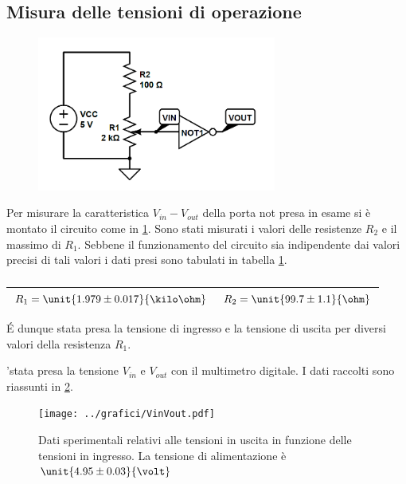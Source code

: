\documentclass[a4paper,10pt]{article}
\begin{document}
\subsection{Misura delle tensioni di operazione}

\begin{figure}[H]
	\centering
	\includegraphics[width=0.7\textwidth]{../grafici/NOTin.png}
	\caption{}
	\label{fig:NOTin}
\end{figure}
Per misurare la caratteristica $V_{in}-V_{out}$ della porta not presa in esame si è montato il circuito come in \ref{fig:NOTin}. Sono stati misurati i valori delle resistenze $R_2$ e il massimo di $R_1$. Sebbene il funzionamento del circuito sia indipendente dai valori precisi di tali valori i dati presi sono tabulati in tabella \ref{Res1}.

\begin{table}[H]
	\centering
	\begin{tabular}{c|c}
		\hline
		$R_1 = \unit{1.979 \pm 0.017}{\kilo\ohm}$ & $R_2 = \unit{99.7 \pm 1.1}{\ohm}$\\
		\hline
	\end{tabular}
	\caption{}
	\label{Res1}
\end{table}

\'E dunque stata presa la tensione di ingresso e la tensione di uscita per diversi valori della resistenza $R_1$.

'\E stata presa la tensione $V_{in}$ e $V_{out}$ con il multimetro digitale. I dati raccolti sono riassunti in \ref{fig:VinVout}.


\begin{figure}[H]
	\centering
	\texttt{[image: ../grafici/VinVout.pdf]}
	\caption{Dati sperimentali relativi alle tensioni in uscita in funzione delle tensioni in ingresso. La tensione di alimentazione è $ \unit{4.95 \pm 0.03}{\volt}$}
	\label{fig:VinVout}
\end{figure}
\end{document}
